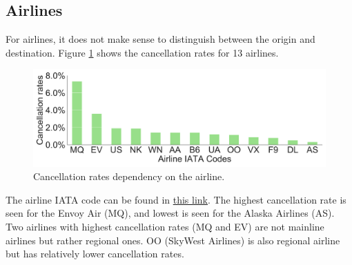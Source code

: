 \documentclass[12pt]{article}
\begin{document}
\subsection{Airlines}
\label{subsec:airlines}
For airlines, it does not make sense to distinguish between the origin and destination. Figure \ref{fig:airlinecanrate} shows the cancellation rates for 13 airlines.  
\begin{figure}[h!]
\begin{center}
\includegraphics[width=6in]{airline_canrate.pdf}
\end{center}
\caption{\label{fig:airlinecanrate}
Cancellation rates dependency on the airline.}
\end{figure}
The airline IATA code can be found in \href{http://www.iata.org/publications/Pages/code-search.aspx}{this link}. The highest cancellation rate is seen for the Envoy Air (MQ), and lowest is seen for the Alaska Airlines (AS). Two airlines with highest cancellation rates (MQ and EV) are not mainline airlines but rather regional ones. OO (SkyWest Airlines) is also regional airline but has relatively lower cancellation rates.
\end{document}
